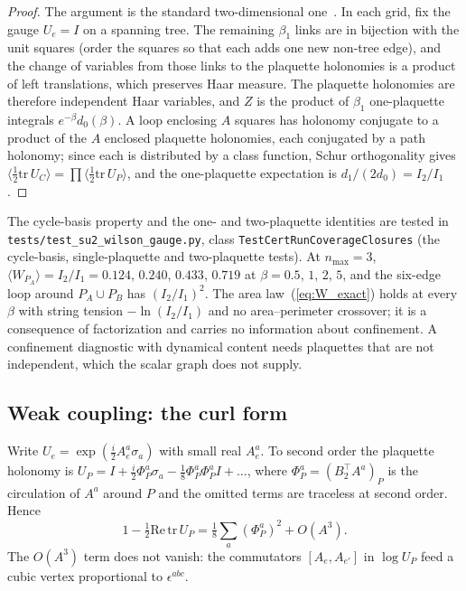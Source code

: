 \documentclass[11pt]{article}
\begin{document}
\begin{proof}
The argument is the standard two-dimensional one~\cite{drouffe_zuber1983,gross_witten1980}.
In each grid, fix the gauge $U_e=I$ on a spanning tree.  The remaining
$\beta_1$ links are in bijection with the unit squares (order the squares so
that each adds one new non-tree edge), and the change of variables from those
links to the plaquette holonomies is a product of left translations, which
preserves Haar measure.  The plaquette holonomies are therefore independent
Haar variables, and $Z$ is the product of $\beta_1$ one-plaquette integrals
$e^{-\beta}d_0(\beta)$.  A loop enclosing $A$ squares has holonomy conjugate
to a product of the $A$ enclosed plaquette holonomies, each conjugated by a
path holonomy; since each is distributed by a class function, Schur
orthogonality gives
$\langle\frac12\mathrm{tr}\,U_C\rangle=\prod\langle\frac12\mathrm{tr}\,U_P\rangle$,
and the one-plaquette expectation is $d_1/(2d_0)=I_2/I_1$.
\end{proof}

The cycle-basis property and the one- and two-plaquette identities are tested
in \texttt{tests/test\_su2\_wilson\_gauge.py}, class
\texttt{TestCertRunCoverageClosures} (the cycle-basis, single-plaquette and
two-plaquette tests).  At $n_{\max}=3$,
$\langle W_{P_A}\rangle=I_2/I_1=0.124$, $0.240$, $0.433$, $0.719$ at
$\beta=0.5$, $1$, $2$, $5$, and the six-edge loop around $P_A\cup P_B$ has
$(I_2/I_1)^2$.  The area law~(\ref{eq:W_exact}) holds at every $\beta$ with
string tension $-\ln(I_2/I_1)$ and no area--perimeter crossover; it is a
consequence of factorization and carries no information about confinement.
A confinement diagnostic with dynamical content needs plaquettes that are not
independent, which the scalar graph does not supply.

\subsection{Weak coupling: the curl form}
\label{sec:weak}

Write $U_e=\exp(\tfrac{i}{2}A_e^a\sigma_a)$ with small real $A_e^a$.  To
second order the plaquette holonomy is
$U_P=I+\tfrac{i}{2}\Phi_P^a\sigma_a-\tfrac18\Phi_P^a\Phi_P^a I+\ldots$, where
$\Phi_P^a=(B_2^{\top}A^a)_P$ is the circulation of $A^a$ around $P$ and the
omitted terms are traceless at second order.  Hence
\begin{equation}
1-\tfrac12\mathrm{Re}\,\mathrm{tr}\,U_P
= \tfrac18\sum_a(\Phi_P^a)^2 + O(A^3).
\label{eq:plaquette_quadratic}
\end{equation}
The $O(A^3)$ term does not vanish: the commutators $[A_e,A_{e'}]$ in
$\log U_P$ feed a cubic vertex proportional to $\epsilon^{abc}$.
\end{document}
